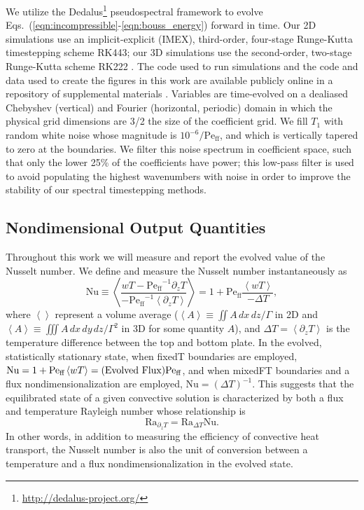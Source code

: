 \documentclass[aps, pre, onecolumn, nofootinbib, notitlepage, groupedaddress, amsfonts, amssymb, amsmath, longbibliography]{revtex4-1}
\newcommand{\angles}[1]{\ensuremath{\left\langle #1 \right\rangle}}
\newcommand{\Peff}{\ensuremath{\text{Pe}_{\text{ff}}}}
\begin{document}
We utilize the Dedalus\footnote{\url{http://dedalus-project.org/}} pseudospectral framework \cite{burns&all2016, burns&all2019} to evolve Eqs.~(\ref{eqn:incompressible}-\ref{eqn:bouss_energy}) forward in time.
Our 2D simulations use an implicit-explicit (IMEX), third-order, four-stage Runge-Kutta timestepping scheme RK443; our 3D simulations use the second-order, two-stage Runge-Kutta scheme RK222 \cite{ascher&all1997}. 
The code used to run simulations and the code and data used to create the figures in this work are available publicly online in a repository of supplemental materials \cite{anders&all2020a_supp}.
Variables are time-evolved on a dealiased Chebyshev (vertical) and Fourier (horizontal, periodic) domain in which the physical grid dimensions are 3/2 the size of the coefficient grid.  
We fill $T_1$ with random white noise whose magnitude is $10^{-6}/\Peff$, and which is vertically tapered to zero at the boundaries.
We filter this noise spectrum in coefficient space, such that only the lower 25\% of the coefficients have power; this low-pass filter is used to avoid populating the highest wavenumbers with noise in order to improve the stability of our spectral timestepping methods.


\subsection{Nondimensional Output Quantities}
\label{sec:ra_nu_relations}
Throughout this work we will measure and report the evolved value of the Nusselt number.
We define and measure the Nusselt number instantaneously as
\begin{equation}
\text{Nu} \equiv \angles{\frac{w T - \Peff^{-1} \partial_z T}{-\Peff^{-1} \angles{\partial_z T}}}
= 1 + \Peff\frac{\angles{w T}}{-\Delta T},
\end{equation}
where $\angles{}$ represent a volume average ($\angles{A} \equiv \iint A\,dx\,dz / \Gamma$ in 2D and $\angles{A} \equiv \iiint A\,dx\,dy\,dz / \Gamma^2$ in 3D for some quantity $A$), and $\Delta T = \angles{\partial_z T}$ is the temperature difference between the top and bottom plate.
In the evolved, statistically stationary state, when fixedT boundaries are employed, $\text{Nu} = 1 + \Peff\angles{wT} = \text{(Evolved Flux)\Peff}$, and when mixedFT boundaries and a flux nondimensionalization are employed, $\text{Nu} = (\Delta T)^{-1}$.
This suggests that the equilibrated state of a given convective solution is characterized by both a flux and temperature Rayleigh number whose relationship is
\begin{equation}
\text{Ra}_{\partial_z T} = \text{Ra}_{\Delta T} \text{Nu}.
\label{eqn:ra_relation}
\end{equation}
In other words, in addition to measuring the efficiency of convective heat transport, the Nusselt number is also the unit of conversion between a temperature and a flux nondimensionalization in the evolved state.
\end{document}
